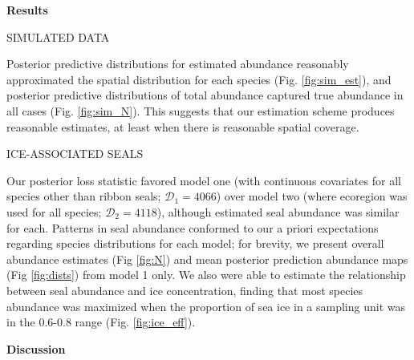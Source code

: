 \documentclass[12pt,fleqn]{article}
\begin{document}
\begin{flushleft}
\vspace{.3in}
{\bf Results} \\
\vspace{.15in}

\vspace{.15in}
SIMULATED DATA \\
\vspace{.15in}

Posterior predictive distributions for estimated abundance reasonably approximated the spatial distribution for each species (Fig. \ref{fig:sim_est}), and posterior predictive distributions of total abundance captured true abundance in all cases (Fig. \ref{fig:sim_N}).  This suggests that our estimation scheme produces reasonable estimates, at least when there is reasonable spatial coverage.

\vspace{.15in}
ICE-ASSOCIATED SEALS\\
\vspace{.15in}

Our posterior loss statistic favored model one (with continuous covariates for all species other than ribbon seals; $\mathcal{D}_1=4066$) over model two (where ecoregion was used for all species; $\mathcal{D}_2=4118$), although estimated
seal abundance was similar for each. Patterns in seal abundance conformed to our a priori expectations regarding species distributions for each model; for brevity, we present overall abundance estimates (Fig \ref{fig:N}) and mean posterior prediction abundance maps (Fig \ref{fig:dists}) from model 1 only. We also were able to estimate the relationship between seal abundance and ice concentration, finding that most species abundance was maximized when the proportion of sea ice in a sampling unit was in the 0.6-0.8 range (Fig. \ref{fig:ice_eff}).


\vspace{.3in}
{\bf Discussion} \\
\vspace{.15in}


\end{flushleft}
\end{document}

